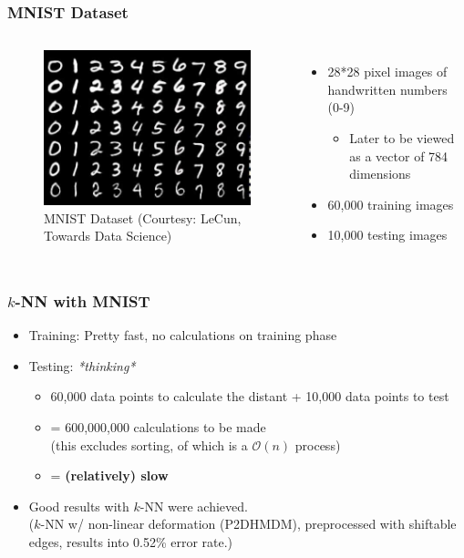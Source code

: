 \documentclass[aspectratio=169]{beamer}
\begin{document}
\begin{frame}
	\frametitle{MNIST Dataset}
	\begin{columns}
		\begin{figure}
			\includegraphics[width=1.0\textwidth]{imgs/mnist.jpeg}
			\caption{MNIST Dataset (Courtesy: LeCun, Towards Data Science)}
		\end{figure}
		\begin{itemize}
			\item<2-> 28*28 pixel images of handwritten numbers (0-9)
			\begin{itemize}
				\item<3-> Later to be viewed as a vector of 784 dimensions
			\end{itemize}
			\item<4-> 60,000 training images
			\item<5-> 10,000 testing images
		\end{itemize}
	\end{columns}
\end{frame}

\begin{frame}
	\frametitle{$k$-NN with MNIST}
	\begin{itemize}
		\item<2-> Training: Pretty fast, no calculations on training phase
		\item<3-> Testing: \textit{*thinking*}
			\begin{itemize}
				\item<4-> 60,000 data points to calculate the distant + 10,000 data points to test
				\item<5-> = 600,000,000 calculations to be made\\
					(this excludes sorting, of which is a $\mathcal{O}(n)$ process)
				\item<6-> = \textbf{(relatively) slow}
			\end{itemize}
		\item<7-> Good results with $k$-NN were achieved.\\
		($k$-NN w/ non-linear deformation (P2DHMDM), preprocessed with shiftable edges, results into 0.52\% error rate.)
	\end{itemize}
\end{frame}
\end{document}
